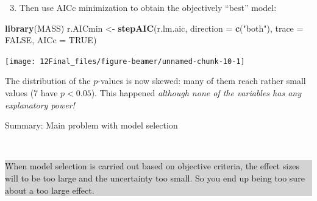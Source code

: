 \documentclass[10pt,ignorenonframetext,]{beamer}
\newenvironment{Shaded}{\begin{snugshade}}{\end{snugshade}}
\newcommand{\DataTypeTok}[1]{\textcolor[rgb]{0.13,0.29,0.53}{#1}}
\newcommand{\DecValTok}[1]{\textcolor[rgb]{0.00,0.00,0.81}{#1}}
\newcommand{\KeywordTok}[1]{\textcolor[rgb]{0.13,0.29,0.53}{\textbf{#1}}}
\newcommand{\NormalTok}[1]{#1}
\newcommand{\OperatorTok}[1]{\textcolor[rgb]{0.81,0.36,0.00}{\textbf{#1}}}
\newcommand{\OtherTok}[1]{\textcolor[rgb]{0.56,0.35,0.01}{#1}}
\newcommand{\StringTok}[1]{\textcolor[rgb]{0.31,0.60,0.02}{#1}}
\providecommand{\tightlist}{%
  \setlength{\itemsep}{0pt}\setlength{\parskip}{0pt}}
\begin{document}
\begin{frame}[fragile]

\begin{enumerate}
\setcounter{enumi}{2}
\tightlist
\item
  Then use AICc minimization to obtain the objectively ``best'' model:
\end{enumerate}

\vspace{2mm}

\scriptsize

\begin{Shaded}
\begin{Highlighting}[]
\KeywordTok{library}\NormalTok{(MASS)}
\NormalTok{r.AICmin <-}\StringTok{ }\KeywordTok{stepAIC}\NormalTok{(r.lm.aic, }\DataTypeTok{direction =} \KeywordTok{c}\NormalTok{(}\StringTok{"both"}\NormalTok{), }\DataTypeTok{trace =} \OtherTok{FALSE}\NormalTok{, }\DataTypeTok{AICc =} \OtherTok{TRUE}\NormalTok{)}
\end{Highlighting}
\end{Shaded}

\centering

\begin{Shaded}
\end{Shaded}

\texttt{[image: 12Final\_files/figure-beamer/unnamed-chunk-10-1]}

\flushleft
\normalsize

The distribution of the \(p\)-values is now skewed: many of them reach
rather small values (7 have \(p<0.05\)). This happened \emph{although
none of the variables has any explanatory power!}

\end{frame}

\begin{frame}

\begin{block}{Summary: Main problem with model selection}

\(~\)

\colorbox{lightgray}{\begin{minipage}{10cm}
When model selection is carried out based on objective criteria, the effect sizes will to be too large and the uncertainty too small. So you end up being too sure about a too large effect. 
\end{minipage}}

\end{block}

\end{frame}
\end{document}
